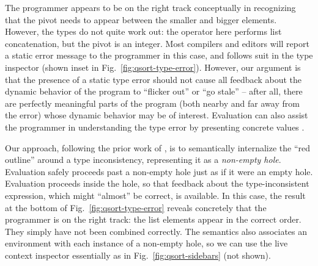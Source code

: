 The programmer appears to be on the right track conceptually
in recognizing that the pivot needs to appear between the 
smaller and bigger elements. 
However, the types do not quite work out: the  operator here
performs list concatenation, but the pivot is an integer. 
Most compilers and editors will report a static error message
to the programmer in this case, and \Hazel 
follows suit in the type inspector (shown inset in Fig.~\ref{fig:qsort-type-error}). 
However, our argument is that the presence of a static type error should not cause all feedback about 
the dynamic behavior of the program to ``flicker out'' or ``go stale'' --
after all, there are perfectly meaningful parts of the program (both nearby
and far away from the error) 
whose dynamic behavior may be of interest. Evaluation can also assist the programmer in understanding the type error by presenting concrete values \cite{Seidel2016}.

Our approach, following the prior work of \citet{popl-paper}, 
is to semantically internalize the ``red outline'' around
a type inconsistency, representing it as a \emph{non-empty hole}.
Evaluation safely proceeds past a non-empty hole just as if it were an empty hole.
Evaluation proceeds inside the hole, so that 
feedback about the type-inconsistent expression, which might ``almost'' be correct, is available. 
In this case, the result at the bottom of Fig.~\ref{fig:qsort-type-error}
reveals concretely that the programmer is on the right track: the list elements 
appear in the correct order.
They simply have not been combined correctly. 
The semantics also associates an environment with each instance of a non-empty hole,
so we can use the live context inspector essentially as in Fig.~\ref{fig:qsort-sidebars} (not shown). 






